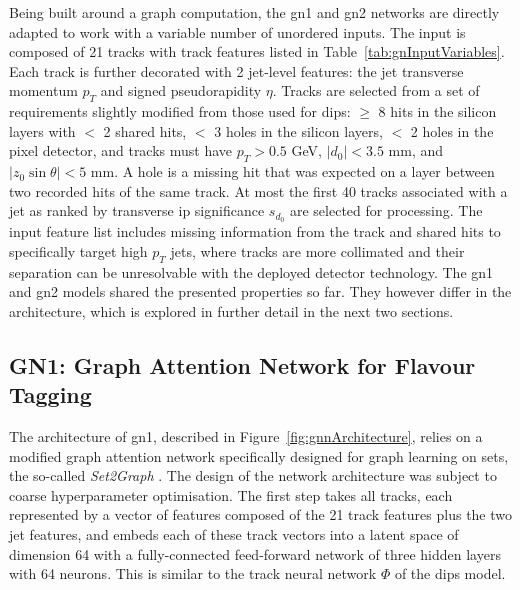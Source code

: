 Being built around a graph computation, the \gls{gn1} and \gls{gn2} networks are directly adapted to work with a variable number of unordered inputs. The input is composed of 21 tracks with track features listed in Table~\ref{tab:gnInputVariables}. Each track is further decorated with 2 jet-level features: the jet transverse momentum $p_T$ and signed pseudorapidity $\eta$. Tracks are selected from a set of requirements slightly modified from those used for \gls{dips}: $\geq$ 8 hits in the silicon layers with $<$ 2 shared hits, $<$ 3 holes in the silicon layers, $<$ 2 holes in the pixel detector, and tracks must have $p_T > 0.5$ GeV, $|d_0| < 3.5$ mm, and $|z_0 \sin\theta| < 5$ mm. A hole is a missing hit that was expected on a layer between two recorded hits of the same track. At most the first 40 tracks associated with a jet as ranked by transverse \gls{ip} significance $s_{d_0}$ are selected for processing. The input feature list includes missing information from the track and shared hits to specifically target high $p_T$ jets, where tracks are more collimated and their separation can be unresolvable with the deployed detector technology. The \gls{gn1} and \gls{gn2} models shared the presented properties so far. They however differ in the architecture, which is explored in further detail in the next two sections.

\subsection{GN1: Graph Attention Network for Flavour Tagging}\label{chap-GN1}
The architecture of \gls{gn1}, described in Figure~\ref{fig:gnnArchitecture}, relies on a modified graph attention network \cite{brody2022how} specifically designed for graph learning on sets, the so-called \textit{Set2Graph} \cite{serviansky2020set2graph}. The design of the network architecture was subject to coarse hyperparameter optimisation. The first step takes all tracks, each represented by a vector of features composed of the 21 track features plus the two jet features, and embeds each of these track vectors into a latent space of dimension 64 with a fully-connected feed-forward network of three hidden layers with 64 neurons. This is similar to the track neural network $\Phi$ of the \gls{dips} model. \\

